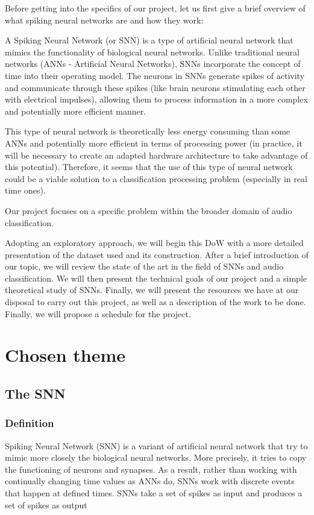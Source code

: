 \documentclass[11pt]{article}
\begin{document}
Before getting into the specifics of our project, let us first give a brief overview of what spiking neural networks are and how they work:

A Spiking Neural Network (or SNN) is a type of artificial neural network that mimics the functionality of biological neural networks. Unlike traditional neural networks (ANNs - Artificial Neural Networks), SNNs incorporate the concept of time into their operating model. The neurons in SNNs generate spikes of activity and communicate through these spikes (like brain neurons stimulating each other with electrical impulses), allowing them to process information in a more complex and potentially more efficient manner.

This type of neural network is theoretically less energy consuming than some ANNs and potentially more efficient in terms of processing power (in practice, it will be necessary to create an adapted hardware architecture to take advantage of this potential). Therefore, it seems that the use of this type of neural network could be a viable solution to a classification processing problem (especially in real time ones).

Our project focuses on a specific problem within the broader domain of audio classification.

Adopting an exploratory approach, we will begin this DoW with a more detailed presentation of the dataset used and its construction. After a brief introduction of our topic, we will review the state of the art in the field of SNNs and audio classification. We will then present the technical goals of our project and a simple theoretical study of SNNs. Finally, we will present the resources we have at our disposal to carry out this project, as well as a description of the work to be done. Finally, we will propose a schedule for the project.



\section{Chosen theme}
\subsection{The SNN}
\subsubsection{Definition}
Spiking Neural Network (SNN) is a variant of artificial neural network that try to mimic more closely the biological neural networks. More precisely, it tries to copy the functioning of neurons and synapses. As a result, rather than working with continually changing time values as ANNs do, SNNs work with discrete events that happen at defined times. SNNs take a set of spikes as input and produces a set of spikes as output
\end{document}

